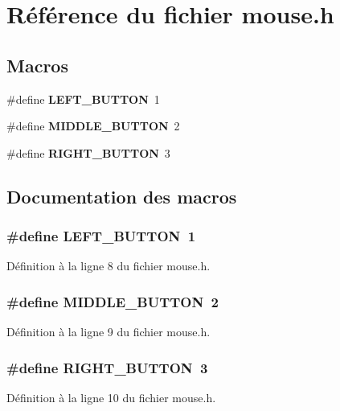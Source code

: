 \section{Référence du fichier mouse.h}
\label{mouse_8h}
\subsection*{Macros}
\begin{DoxyCompactItemize}
\item 
\#define {\bf LEFT\_\-BUTTON}~1
\item 
\#define {\bf MIDDLE\_\-BUTTON}~2
\item 
\#define {\bf RIGHT\_\-BUTTON}~3
\end{DoxyCompactItemize}


\subsection{Documentation des macros}
\subsubsection[{LEFT\_\-BUTTON}]{\setlength{\rightskip}{0pt plus 5cm}\#define LEFT\_\-BUTTON~1}\label{mouse_8h_abbc8382ae4ea521f03c119a14478b759}


Définition à la ligne 8 du fichier mouse.h.

\subsubsection[{MIDDLE\_\-BUTTON}]{\setlength{\rightskip}{0pt plus 5cm}\#define MIDDLE\_\-BUTTON~2}\label{mouse_8h_aea4935ff922fa4fbbc0f03fc250e268b}


Définition à la ligne 9 du fichier mouse.h.

\subsubsection[{RIGHT\_\-BUTTON}]{\setlength{\rightskip}{0pt plus 5cm}\#define RIGHT\_\-BUTTON~3}\label{mouse_8h_aeb17351958162535ab6af2cd6b030955}


Définition à la ligne 10 du fichier mouse.h.

